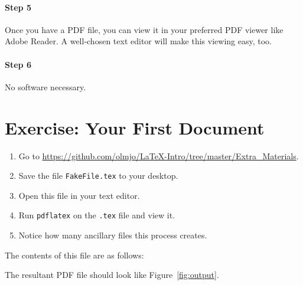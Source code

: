 \paragraph{Step 5} Once you have a PDF file, you can view it in your preferred
PDF viewer like Adobe Reader. A well-chosen text editor will make this viewing
easy, too.

\paragraph{Step 6} No software necessary.

\section{Exercise: Your First Document}

\begin{enumerate}
\item Go to
  \url{https://github.com/olmjo/LaTeX-Intro/tree/master/Extra_Materials}.

\item Save the file \texttt{FakeFile.tex} to your desktop.

\item Open this file in your text editor.

\item Run \texttt{pdflatex} on the \texttt{.tex} file and view it.

\item Notice how many ancillary files this process creates.

\end{enumerate}

The contents of this file are as follows:



The resultant PDF file should look like Figure~\ref{fig:output}.

